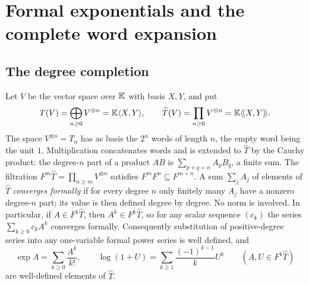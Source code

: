 \section{Formal exponentials and the complete word expansion}\label{sec:formal}
\subsection{The degree completion}
Let $V$ be the vector space over $\mathbb{K}$ with basis $X,Y$, and put
\[
 T(V)=\bigoplus_{n\geq0}V^{\otimes n}=\mathbb{K}\langle X,Y\rangle,
 \qquad
 \widehat T(V)=\prod_{n\geq0}V^{\otimes n}=\mathbb{K}\langle\!\langle X,Y\rangle\!\rangle.
\]
The space $V^{\otimes n}=T_n$ has as basis the $2^n$ words of length $n$, the
empty word being the unit $1$. Multiplication concatenates words and is
extended to $\widehat T$ by the Cauchy product: the degree-$n$ part of a
product $AB$ is $\sum_{p+q=n}A_pB_q$, a finite sum. The filtration
$F^m\widehat T=\prod_{n\geq m}V^{\otimes n}$ satisfies
$F^mF^n\subseteq F^{m+n}$. A sum $\sum_j A_j$ of elements of $\widehat T$
\emph{converges formally} if for every degree $n$ only finitely many $A_j$
have a nonzero degree-$n$ part; its value is then defined degree by degree. No
norm is involved. In particular, if $A\in F^1\widehat T$, then $A^k\in
F^k\widehat T$, so for any scalar sequence $(c_k)$ the series
$\sum_{k\geq0}c_kA^k$ converges formally. Consequently substitution of
positive-degree series into any one-variable formal power series is well
defined, and
\begin{equation}\label{eq:explog}
 \exp A=\sum_{k\geq0}\frac{A^k}{k!},\qquad
 \log(1+U)=\sum_{k\geq1}\frac{(-1)^{k-1}}{k}U^k
 \qquad(A,U\in F^1\widehat T)
\end{equation}
are well-defined elements of $\widehat T$.

